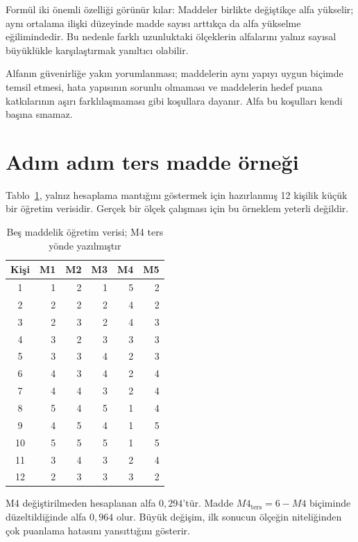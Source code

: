 Formül iki önemli özelliği görünür kılar: Maddeler birlikte değiştikçe alfa
yükselir; aynı ortalama ilişki düzeyinde madde sayısı arttıkça da alfa
yükselme eğilimindedir. Bu nedenle farklı uzunluktaki ölçeklerin alfalarını
yalnız sayısal büyüklükle karşılaştırmak yanıltıcı olabilir.

\begin{assumptionbox}
Alfanın güvenirliğe yakın yorumlanması; maddelerin aynı yapıyı uygun biçimde
temsil etmesi, hata yapısının sorunlu olmaması ve maddelerin hedef puana
katkılarının aşırı farklılaşmaması gibi koşullara dayanır. Alfa bu koşulları
kendi başına sınamaz.
\end{assumptionbox}

\section{Adım adım ters madde örneği}

Tablo~\ref{tab:reliability-small-data}, yalnız hesaplama mantığını göstermek
için hazırlanmış 12 kişilik küçük bir öğretim verisidir. Gerçek bir ölçek
çalışması için bu örneklem yeterli değildir.

\begin{table}[htbp]
\centering
\caption{Beş maddelik öğretim verisi; M4 ters yönde yazılmıştır}
\label{tab:reliability-small-data}
\small
\begin{tabular}{@{}crrrrr@{}}
\toprule
Kişi & M1 & M2 & M3 & M4 & M5 \\
\midrule
1 & 1 & 2 & 1 & 5 & 2 \\
2 & 2 & 2 & 2 & 4 & 2 \\
3 & 2 & 3 & 2 & 4 & 3 \\
4 & 3 & 2 & 3 & 3 & 3 \\
5 & 3 & 3 & 4 & 2 & 3 \\
6 & 4 & 3 & 4 & 2 & 4 \\
7 & 4 & 4 & 3 & 2 & 4 \\
8 & 5 & 4 & 5 & 1 & 4 \\
9 & 4 & 5 & 4 & 1 & 5 \\
10 & 5 & 5 & 5 & 1 & 5 \\
11 & 3 & 4 & 3 & 2 & 4 \\
12 & 2 & 3 & 3 & 3 & 2 \\
\bottomrule
\end{tabular}
\end{table}

M4 değiştirilmeden hesaplanan alfa $0{,}294$'tür. Madde
$M4_{\text{ters}}=6-M4$ biçiminde düzeltildiğinde alfa $0{,}964$ olur. Büyük
değişim, ilk sonucun ölçeğin niteliğinden çok puanlama hatasını yansıttığını
gösterir.

